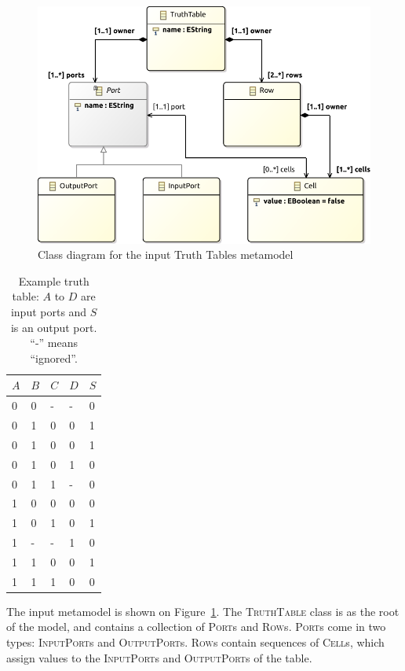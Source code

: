\documentclass[a4paper]{scrartcl}
\newcommand*{\class}[1]{\textsc{#1}}
\begin{document}
\begin{figure}
  \centering
  \includegraphics[width=.9\textwidth]{tt}
  \caption{Class diagram for the input Truth Tables metamodel}
  \label{fig:tt-metamodel}
\end{figure}

\begin{table}
  \centering
  \begin{tabular}{llll|l}
    $A$ & $B$ & $C$ & $D$ & $S$ \\
    \hline
    0 & 0 & - & - & 0 \\
    0 & 1 & 0 & 0 & 1 \\
    0 & 1 & 0 & 0 & 1 \\
    0 & 1 & 0 & 1 & 0 \\
    0 & 1 & 1 & - & 0 \\
    1 & 0 & 0 & 0 & 0 \\
    1 & 0 & 1 & 0 & 1 \\
    1 & - & - & 1 & 0 \\
    1 & 1 & 0 & 0 & 1 \\
    1 & 1 & 1 & 0 & 0 \\
  \end{tabular}
  \caption{Example truth table: $A$ to $D$ are input ports and $S$ is an output port. ``-'' means ``ignored''.}
  \label{tab:tt-example}
\end{table}

The input metamodel is shown on Figure~\ref{fig:tt-metamodel}. The
\class{Truth\-Table} class is as the root of the model, and contains a
collection of \class{Port}s and \class{Row}s. \class{Port}s come in two types:
\class{Input\-Port}s and \class{Output\-Port}s. \class{Row}s contain sequences
of \class{Cell}s, which assign values to the \class{Input\-Port}s and
\class{Output\-Port}s of the table.
\end{document}
